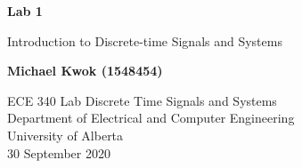\documentclass{article}
\begin{document}
\begin{titlepage}
     \begin{center}
          \vspace*{1cm}

          \textbf{Lab 1}

          \vspace{0.5cm}

          \Large{Introduction to Discrete-time Signals and Systems}
          \vspace{1.5cm}

          \textbf{Michael Kwok (1548454)}

          \vfill
          ECE 340 Lab Discrete Time Signals and Systems\\
          Department of Electrical and Computer Engineering\\
          University of Alberta\\
          30 September 2020
     \end{center}
\end{titlepage}
\end{document}
